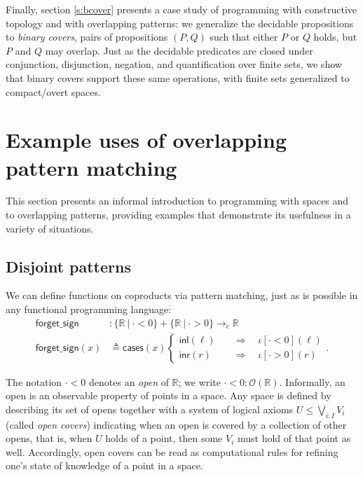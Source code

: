 \documentclass[conference]{IEEEtran}
\newcommand{\cto}{\to_c}
\newcommand{\R}{\mathbb{R}}
\newcommand{\suchthat}{\ |\ }
\newcommand{\Open}[1]{\mathcal{O}({#1})}
\newcommand{\oinclf}[1]{\iota[{#1}]}
\newcommand{\oincl}[2]{\oinclf{#1} \left({#2}\right)}
\newcommand{\Branch}{\Rightarrow}
\begin{document}
Finally, section \ref{s:bcover} presents a case study of programming with constructive topology and with overlapping patterns: we generalize the decidable propositions to \emph{binary covers}, pairs of propositions $(P, Q)$ such that either $P$ or $Q$ holds, but $P$ and $Q$ may overlap. Just as the decidable predicates are closed under conjunction, disjunction, negation, and quantification over finite sets, we show that binary covers support these same operations, with finite sets generalized to compact/overt spaces.

\section{Example uses of overlapping pattern matching}
\label{s:examples}

This section presents an informal introduction to programming with spaces and to overlapping patterns, providing examples that demonstrate its usefulness in a variety of situations.

\subsection{Disjoint patterns}

We can define functions on coproducts via pattern matching, just as is possible in any functional programming language:
\begin{align*}
\mathsf{forget\_sign} &: \{ \R \suchthat \cdot < 0 \} + \{ \R \suchthat \cdot > 0 \} \cto \R
\\ \mathsf{forget\_sign}(x) &\triangleq
  \mathsf{cases}(x)
  \begin{cases}
  \mathsf{inl}(\ell) \quad &\Branch \quad \oincl{\cdot < 0}{\ell}
  \\ \mathsf{inr}(r) \quad &\Branch \quad \oincl{\cdot > 0}{r}
  \end{cases}.
\end{align*}

The notation $\cdot < 0$ denotes an \emph{open} of $\R$; we write $\cdot < 0 : \Open{\R}$. Informally, an open is an observable property of points in a space. Any space is defined by describing its set of opens together with a system of logical axioms $U \le \bigvee_{i : I} V_i$ (called \emph{open covers}) indicating when an open is covered by a collection of other opens, that is, when $U$ holds of a point, then some $V_i$ must hold of that point as well. Accordingly, open covers can be read as computational rules for refining one's state of knowledge of a point in a space.
\end{document}
